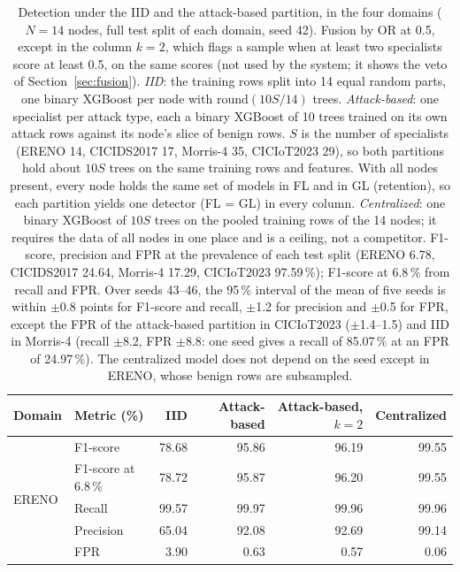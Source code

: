 \begin{table}[htbp]
\centering
\caption{Detection under the IID and the attack-based partition, in the four domains
($N{=}14$ nodes, full test split of each domain, seed 42). Fusion by OR at 0.5, except in
the column $k{=}2$, which flags a sample when at least two specialists score at least 0.5,
on the same scores (not used by the system; it shows the veto of
Section~\ref{sec:fusion}).
\emph{IID}: the training rows split into 14 equal random parts, one binary XGBoost per node
with $\mathrm{round}(10S/14)$ trees. \emph{Attack-based}: one specialist per attack type,
each a binary XGBoost of 10 trees trained on its own attack rows against its node's slice
of benign rows. $S$ is the number of specialists (ERENO 14, CICIDS2017 17, Morris-4 35,
CICIoT2023 29), so both partitions hold about $10S$ trees on the same training rows and
features. With all nodes present, every node holds the same set of models in FL and in GL
(retention), so each partition yields one detector (FL = GL) in every column.
\emph{Centralized}: one
binary XGBoost of $10S$ trees on the pooled training rows of the 14 nodes; it requires the
data of all nodes in one place and is a ceiling, not a competitor. F1-score, precision and
FPR at the prevalence of each test split (ERENO 6.78, CICIDS2017 24.64, Morris-4 17.29,
CICIoT2023 97.59\,\%); F1-score at 6.8\,\% from recall and FPR. Over seeds 43--46, the
95\,\% interval of the mean of five seeds is within $\pm$0.8 points for F1-score and recall,
$\pm$1.2 for precision and $\pm$0.5 for FPR, except the FPR of the attack-based partition in CICIoT2023
($\pm$1.4--1.5) and IID in Morris-4 (recall $\pm$8.2, FPR $\pm$8.8: one seed gives a recall
of 85.07\,\% at an FPR of 24.97\,\%). The centralized model does not depend on the seed
except in ERENO, whose benign rows are subsampled.}
\label{tab:partition-domains}
\small
\begin{tabular}{@{}llrrrr@{}}
\toprule
Domain & Metric (\%) & IID & Attack-based & Attack-based, $k{=}2$ & Centralized \\
\midrule
\multirow{5}{*}{ERENO}
 & F1-score         & 78.68 & 95.86 & 96.19 & 99.55 \\
 & F1-score at 6.8\,\% & 78.72 & 95.87 & 96.20 & 99.55 \\
 & Recall           & 99.57 & 99.97 & 99.96 & 99.96 \\
 & Precision        & 65.04 & 92.08 & 92.69 & 99.14 \\
 & FPR              &  3.90 &  0.63 &  0.57 &  0.06 \\

\end{tabular}
\end{table}
